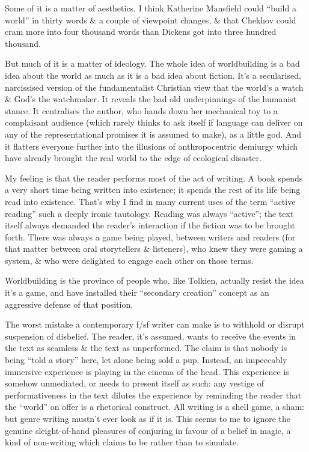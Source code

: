 \documentclass[14pt]{extarticle}
\begin{document}
Some of it is a matter of aesthetics. I think Katherine Mansfield could “build a world” in thirty words \& a couple of viewpoint changes, \& that Chekhov could cram more into four thousand words than Dickens got into three hundred thousand.

But much of it is a matter of ideology. The whole idea of worldbuilding is a bad idea about the world as much as it is a bad idea about fiction. It’s a secularised, narcissised version of the fundamentalist Christian view that the world’s a watch \& God’s the watchmaker. It reveals the bad old underpinnings of the humanist stance. It centralises the author, who hands down her mechanical toy to a complaisant audience (which rarely thinks to ask itself if language can deliver on any of the representational promises it is assumed to make), as a little god. And it flatters everyone further into the illusions of anthropocentric demiurgy which have already brought the real world to the edge of ecological disaster.

My feeling is that the reader performs most of the act of writing. A book spends a very short time being written into existence; it spends the rest of its life being read into existence. That’s why I find in many current uses of the term “active reading” such a deeply ironic tautology. Reading was always “active”; the text itself always demanded the reader’s interaction if the fiction was to be brought forth. There was always a game being played, between writers and readers (for that matter between oral storytellers \& listeners), who knew they were gaming a system, \& who were delighted to engage each other on those terms.

Worldbuilding is the province of people who, like Tolkien, actually resist the idea it’s a game, and have installed their “secondary creation” concept as an aggressive defense of that position.

The worst mistake a contemporary f/sf writer can make is to withhold or disrupt suspension of disbelief. The reader, it’s assumed, wants to receive the events in the text as seamless \& the text as unperformed. The claim is that nobody is being “told a story” here, let alone being sold a pup. Instead, an impeccably immersive experience is playing in the cinema of the head. This experience is somehow unmediated, or needs to present itself as such: any vestige of performativeness in the text dilutes the experience by reminding the reader that the “world” on offer is a rhetorical construct. All writing is a shell game, a sham: but genre writing mustn’t ever look as if it is. This seems to me to ignore the genuine sleight-of-hand pleasures of conjuring in favour of a belief in magic, a kind of non-writing which claims to be rather than to simulate.
\end{document}
